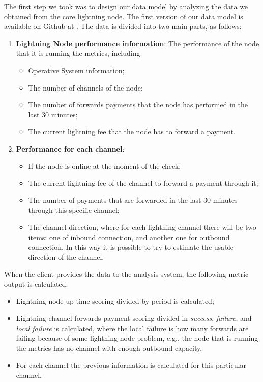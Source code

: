 The first step we took was to design our data model by analyzing the data we 
obtained from the core lightning node. The first version of our data model is 
available on Github at \cite{lnmetrics_localreputation}. The data is divided 
into two main parts, as follows:

\begin{enumerate}
    \item {\bf Lightning Node performance information}: The performance of the node that it is running
        the metrics, including:
        \begin{itemize}
           \item Operative System information;
           \item The number of channels of the node;
           \item The number of forwards payments that the node has performed in the 
               last 30 minutes;
           \item The current lightning fee that the node has to 
               forward a payment.
        \end{itemize}
    \item {\bf Performance for each channel}:
    \begin{itemize}
        \item If the node is online at the moment of the check;
        \item The current lightning fee of the channel to forward a payment through it;
        \item The number of payments that are forwarded in the last 30 minutes through this specific 
            channel;
        \item The channel direction, where for each lightning channel there will be two items: one of 
            inbound connection, and another one for outbound connection. In this way it is possible to 
            try to estimate the usable direction of the channel.
    \end{itemize}
\end{enumerate}

When the client provides the data to the analysis system, the following metric 
output is calculated:

\begin{itemize}
    \item Lightning node up time scoring divided by period is calculated;
    \item Lightning channel forwards payment scoring divided in \emph{success}, \emph{failure}, and \emph{local failure}
        is calculated, where the local failure is how many forwards are failing because of some lightning node problem,
        e.g., the node that is running the metrics has no channel with enough outbound capacity. 
    \item For each channel the previous information is calculated for this particular channel.
\end{itemize}


